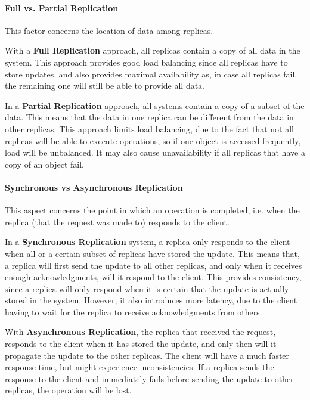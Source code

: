 \paragraph{Full vs. Partial Replication}
\label{par:full_vs_partial_replication} This factor concerns the location of data among replicas.
\par With a \textbf{Full Replication} approach, all replicas contain a copy of all data in the system. This approach provides good load balancing since all replicas have to store updates, and also provides maximal availability as, in case all replicas fail, the remaining one will still be able to provide all data.
\par In a \textbf{Partial Replication} approach, all systems contain a copy of a subset of the data. This means that the data in one replica can be different from the data in other replicas. This approach limits load balancing, due to the fact that not all replicas will be able to execute operations, so if one object is accessed frequently, load will be unbalanced. It may also cause unavailability if all replicas that have a copy of an object fail.
%
%
%
\paragraph{Synchronous vs Asynchronous Replication}
\label{par:synchronous_vs_asynchronous_replication}
\par This aspect concerns the point in which an operation is completed, i.e. when the replica (that the request was made to) responds to the client.
\par In a \textbf{Synchronous Replication} system, a replica only responds to the client when all or a certain subset of replicas have stored the update. This means that, a replica will first send the update to all other replicas, and only when it receives enough acknowledgments, will it respond to the client. This provides consistency, since a replica will only respond when it is certain that the update is actually stored in the system. However, it also introduces more latency, due to the client having to wait for the replica to receive acknowledgments from others.
\par With \textbf{Asynchronous Replication}, the replica that received the request, responds to the client when it has stored the update, and only then will it propagate the update to the other replicas. The client will have a much faster response time, but might experience inconsistencies. If a replica sends the response to the client and immediately fails before sending the update to other replicas, the operation will be lost.

